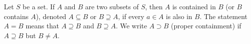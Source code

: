 Let $S$ be a set. If $A$ and $B$ are two subsets of $S$, then $A$ is contained in $B$ (or $B$ contains $A$), denoted $A \subseteq B$ or $B \supseteq A$, if every $a \in A$ is also in $B$. The statement $A = B$ means that $A \supseteq B$ and $B \supseteq A$. We write $A \supset B$ (proper containment) if $A \supseteq B$ but $B \neq A$.
